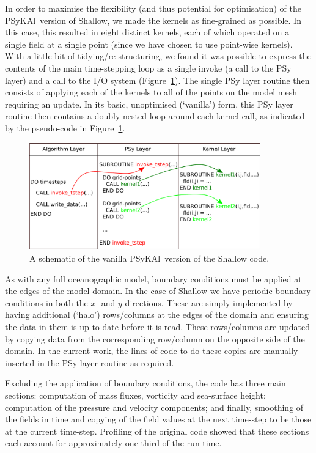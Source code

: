 \documentclass{IOS-Book-Article}
\newcommand{\psykal}{{PS}y{KA}l}
\begin{document}
In order to maximise the flexibility (and thus potential for
optimisation) of the \psykal\ version of Shallow, we made the kernels
as fine-grained as possible. In this case, this resulted in eight
distinct kernels, each of which operated on a single field at a single
point (since we have chosen to use point-wise kernels). With a little
bit of tidying/re-structuring, we found it was possible to express the
contents of the main time-stepping loop as a single invoke (a call to
the PSy layer) and a call to the I/O system
(Figure~\ref{FIG_psykal_shallow_structure}). The single PSy layer
routine then consists of applying each of the kernels to all of the
points on the model mesh requiring an update. In its basic,
unoptimised (`vanilla') form, this PSy layer routine then contains a
doubly-nested loop around each kernel call, as indicated by the
pseudo-code in Figure~\ref{FIG_psykal_shallow_structure}.

\begin{figure}
\centering
\includegraphics[width=100mm]{psykal_shallow}
\caption{A schematic of the vanilla \psykal\ version of the Shallow code.}
\label{FIG_psykal_shallow_structure}
\end{figure}

As with any full oceanographic model, boundary conditions must be
applied at the edges of the model domain. In the case of Shallow we
have periodic boundary conditions in both the $x$- and $y$-directions.
These are simply implemented by having additional (`halo')
rows/columns at the edges of the domain and ensuring the data in them
is up-to-date before it is read. These rows/columns are updated by
copying data from the corresponding row/column on the opposite side of
the domain. In the current work, the lines of code to do these copies
are manually inserted in the PSy layer routine as required.

Excluding the application of boundary conditions, the code has three
main sections: computation of mass fluxes, vorticity and sea-surface
height; computation of the pressure and velocity components; and
finally, smoothing of the fields in time and copying of the field
values at the next time-step to be those at the current
time-step. Profiling of the original code showed that these 
sections each account for approximately one third of the run-time.
\end{document}
